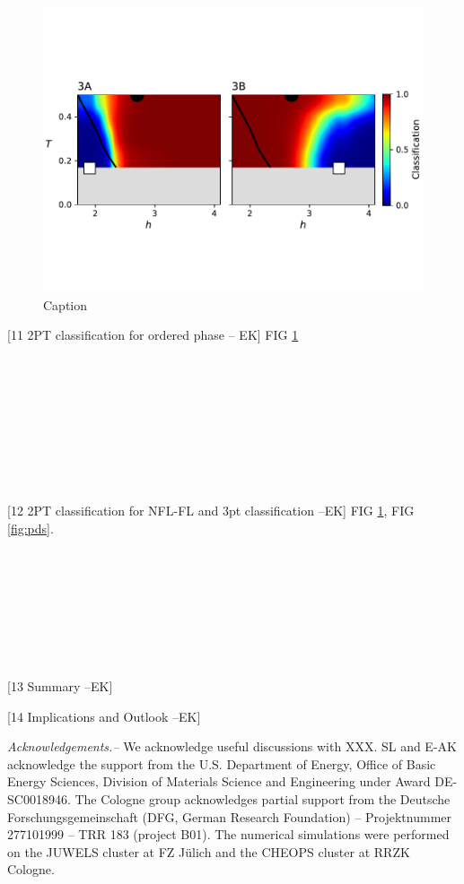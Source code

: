 \documentclass[amsmath,amssymb, aps, prx, longbibliography, twocolumn]{revtex4-1}
\begin{document}
\begin{figure} [t]
    \centering
    \includegraphics[width=.45\textwidth, trim={0 2.5cm 0 3cm}, clip]{2pt_nematic.pdf}
    \caption{Caption}
    \label{fig:2ptnem}
\end{figure}

[11 2PT classification for ordered phase -- EK]
FIG \ref{fig:2ptnem}
\\
\\
\\
\\
\\
\\
\\
\\
\\
\\


[12 2PT classification for NFL-FL and 3pt classification --EK]
FIG \ref{fig:2ptnem}, FIG \ref{fig:pds}.
\\
\\
\\
\\
\\
\\
\\
\\
\\

[13 Summary --EK]

[14 Implications and Outlook --EK]



{\it Acknowledgements.--} 
We acknowledge useful discussions with XXX. SL and E-AK acknowledge the support from the U.S. Department of Energy, Office of Basic Energy Sciences, Division of Materials Science and Engineering under Award DE-SC0018946.
The Cologne group acknowledges partial support from the Deutsche Forschungsgemeinschaft (DFG, German Research Foundation) -- Projektnummer 277101999 -- TRR 183 (project B01).
The numerical simulations were performed on the JUWELS cluster at FZ J\"ulich and the CHEOPS cluster at RRZK Cologne.


%

\appendix
\end{document}
